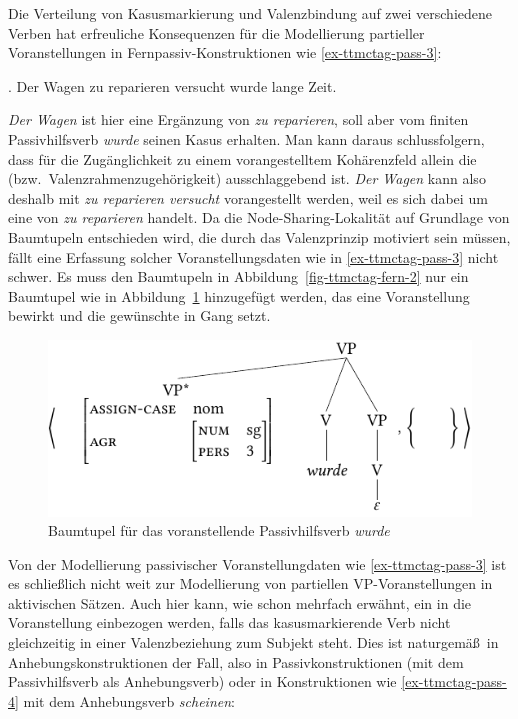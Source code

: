 Die Verteilung von Kasusmarkierung und Valenzbindung auf zwei verschiedene Verben hat erfreuliche Konsequenzen für die Modellierung partieller Voranstellungen in Fernpassiv-Konstruktionen wie \ref{ex-ttmctag-pass-3}:


\ex. \label{ex-ttmctag-pass-3} Der Wagen zu reparieren versucht wurde lange Zeit. \hfill \citep[(316-b)]{Meurers:99}

{\it Der Wagen} ist hier eine Ergänzung von {\it zu reparieren}, soll aber vom finiten Passivhilfsverb {\it wurde} seinen Kasus erhalten. Man kann daraus schlussfolgern, dass  für die Zugänglichkeit zu einem vorangestelltem Kohärenzfeld allein die  (bzw.\ Valenzrahmenzugehörigkeit) ausschlaggebend ist.  {\it Der Wagen} kann also deshalb mit {\it zu reparieren versucht} vorangestellt werden, weil es sich dabei um eine  von {\it zu reparieren} handelt. Da die Node-Sharing-Lokalität auf Grundlage von Baumtupeln entschieden wird, die durch das Valenzprinzip motiviert sein müssen, fällt eine Erfassung solcher Voranstellungsdaten wie in \ref{ex-ttmctag-pass-3} nicht schwer. Es muss den Baumtupeln in Abbildung~\ref{fig-ttmctag-fern-2} nur ein Baumtupel wie in Abbildung~\ref{fig-ttmctag-fern-3} hinzugefügt werden, das eine Voranstellung bewirkt und die gewünschte  in Gang setzt. 
\begin{figure}[t]
\centering
\includegraphics{graphics/abb724.pdf}
\caption{\label{fig-ttmctag-fern-3}Baumtupel für das voranstellende Passivhilfsverb {\it wurde}}
\end{figure}

Von der Modellierung passivischer Voranstellungdaten wie \ref{ex-ttmctag-pass-3} ist es schlie\ss lich nicht weit zur Modellierung von partiellen VP-Voranstellungen in aktivischen Sätzen. Auch hier kann, wie schon mehrfach erwähnt, ein  in die Voranstellung einbezogen werden, falls das kasusmarkierende Verb nicht gleichzeitig in einer Valenzbeziehung zum Subjekt steht. Dies ist naturgemä\ss\ in Anhebungskonstruktionen der Fall, also in Passivkonstruktionen (mit dem Passivhilfsverb als Anhebungsverb) oder in Konstruktionen wie \ref{ex-ttmctag-pass-4} mit dem Anhebungsverb {\it scheinen}:  

